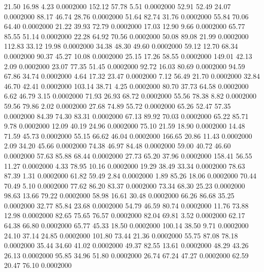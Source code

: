   21.50   16.98    4.23   0.0002000
 152.12   57.78    5.51   0.0002000
  52.91   52.49   24.07   0.0002000
  88.17   46.74   28.76   0.0002000
  51.64   82.74   31.76   0.0002000
  55.84   70.06   64.40   0.0002000
  21.22   39.93   72.79   0.0002000
  17.03   12.90    9.66   0.0002000
  65.77   85.55   51.14   0.0002000
  22.28   64.92   70.56   0.0002000
  50.08   89.08   21.99   0.0002000
 112.83   33.12   19.98   0.0002000
  34.38   48.30   49.60   0.0002000
  59.12   12.70   68.34   0.0002000
  90.37   45.27   10.08   0.0002000
  25.15   17.26   58.55   0.0002000
 149.01   42.13    2.09   0.0002000
  23.07   77.35   51.45   0.0002000
  92.72   16.03   80.69   0.0002000
  94.59   67.86   34.74   0.0002000
   4.64   17.32   23.47   0.0002000
   7.12   56.49   21.70   0.0002000
  32.84   46.70   42.41   0.0002000
 103.14   38.71    4.25   0.0002000
  80.70   37.73   64.58   0.0002000
   6.62   46.79    3.15   0.0002000
  71.93   26.93   68.72   0.0002000
  55.56   78.38    8.82   0.0002000
  59.56   79.86    2.02   0.0002000
  27.68   74.89   55.72   0.0002000
  65.26   52.47   57.35   0.0002000
  84.39   74.30   83.31   0.0002000
  67.13   89.92   70.03   0.0002000
  65.22   85.71    9.78   0.0002000
  12.09   40.19   24.96   0.0002000
  75.10   21.59   18.90   0.0002000
  14.48   71.59   45.73   0.0002000
  55.15   66.62   46.04   0.0002000
 166.65   20.86   11.43   0.0002000
   2.09   34.20   45.66   0.0002000
  74.38   46.97   84.48   0.0002000
  59.00   40.72   46.60   0.0002000
  57.63   85.88   68.44   0.0002000
  27.73   65.20   37.96   0.0002000
 158.41   56.55   11.27   0.0002000
   4.33   78.95   10.16   0.0002000
  19.29   38.49   33.34   0.0002000
  78.63   87.39    1.31   0.0002000
  61.82   59.49    2.84   0.0002000
   1.89   85.26   18.06   0.0002000
  70.44   70.49    5.10   0.0002000
  77.62   86.20   83.37   0.0002000
  73.34   68.30   25.23   0.0002000
  98.63   13.66   79.22   0.0002000
  58.98   16.61   30.48   0.0002000
  66.26   86.68   35.25   0.0002000
  32.77   85.84   23.68   0.0002000
  54.79   46.59   80.74   0.0002000
  11.76   73.88   12.98   0.0002000
  82.65   75.65   76.57   0.0002000
  82.04   69.81    3.52   0.0002000
  62.17   64.38   66.80   0.0002000
  65.77   45.33   18.50   0.0002000
 100.14   38.50    9.71   0.0002000
  24.10   37.14   24.85   0.0002000
 101.80   73.44   21.36   0.0002000
  55.75   87.08   78.18   0.0002000
  35.44   34.60   41.02   0.0002000
  49.37   82.55   13.61   0.0002000
  48.29   43.26   26.13   0.0002000
  95.85   34.96   51.80   0.0002000
  26.74   67.24   47.27   0.0002000
  62.59   20.47   76.10   0.0002000
